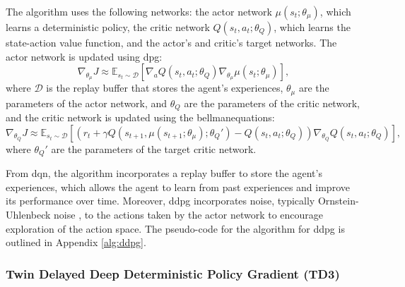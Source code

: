 The algorithm uses the following networks: the actor network $\mu(s_t; \theta_\mu)$, which learns a deterministic policy, the critic network $Q(s_t, a_t; \theta_Q)$, which learns the state-action value function, and the actor's and critic's target networks. The actor network is updated using \acrshort{dpg}: 
\begin{equation}
    \nabla_{\theta_\mu} J \approx \mathbb{E}_{s_t \sim \mathcal{D}} \left[\nabla_a Q(s_t, a_t; \theta_Q) \nabla_{\theta_\mu} \mu(s_t; \theta_\mu)\right],
\end{equation}
where $\mathcal{D}$ is the replay buffer that stores the agent's experiences, $\theta_\mu$ are the parameters of the actor network, and $\theta_Q$ are the parameters of the critic network, and the critic network is updated using the \Gls{bellmanequations}:
\begin{equation}
    \nabla_{\theta_Q} J \approx \mathbb{E}_{s_t \sim \mathcal{D}} \left[\left(r_t + \gamma Q(s_{t+1}, \mu(s_{t+1}; \theta_\mu); \theta_Q') - Q(s_t, a_t; \theta_Q)\right) \nabla_{\theta_Q} Q(s_t, a_t; \theta_Q)\right],
\end{equation}
where $\theta_Q'$ are the parameters of the target critic network. 

From \acrlong{dqn}, the algorithm incorporates a replay buffer to store the agent's experiences, which allows the agent to learn from past experiences and improve its performance over time. Moreover, \acrshort{ddpg} incorporates noise, typically Ornstein-Uhlenbeck noise \cite{Uhlenbeck1930}, to the actions taken by the actor network to encourage \gls{exploration} of the action space. The pseudo-code for the algorithm for \acrshort{ddpg} is outlined in Appendix \ref{alg:ddpg}.

\subsubsection{Twin Delayed Deep Deterministic Policy Gradient (TD3)} \label{sec:td3}

